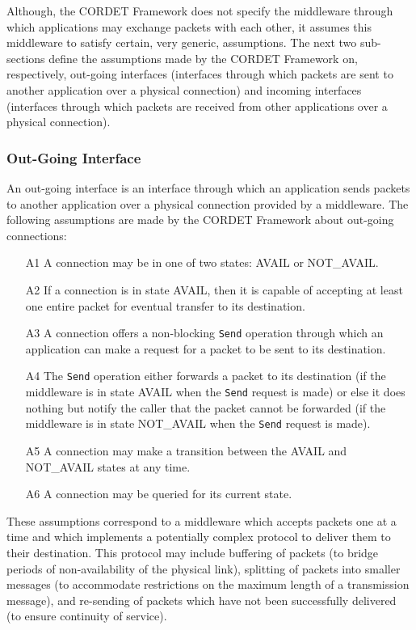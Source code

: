 Although, the CORDET Framework does not specify the middleware through which applications may exchange packets with each other, it assumes this middleware to satisfy certain, very generic, assumptions. The next two sub-sections define the assumptions made by the CORDET Framework on, respectively, out-going interfaces (interfaces through which packets are sent to another application over a physical connection) and incoming interfaces (interfaces through which packets are received from other applications over a physical connection).

\subsubsection{Out-Going Interface}\label{sec:OutGoingConnections}

An out-going interface is an interface through which an application sends packets to another application over a physical connection provided by a middleware. The following assumptions are made by the CORDET Framework about out-going connections:

\begin{itemize}
\item[A1]{A connection may be in one of two states: AVAIL or NOT\_AVAIL.}
\item[A2]{If a connection is in state AVAIL, then it is capable of accepting at least one entire packet for eventual transfer to its destination.}
\item[A3]{A connection offers a non-blocking \texttt{Send} operation through which an application can make a request for a packet to be sent to its destination.}
\item[A4]{The \texttt{Send} operation either forwards a packet to its destination (if the middleware is in state AVAIL when the \texttt{Send} request is made) or else it does nothing but notify the caller that the packet cannot be forwarded (if the middleware is in state NOT\_AVAIL when the \texttt{Send} request is made).}
\item[A5]{A connection may make a transition between the AVAIL and NOT\_AVAIL states at any time.}
\item[A6]{A connection may be queried for its current state.}
\end{itemize}

These assumptions correspond to a middleware which accepts packets one at a time and which implements a potentially complex protocol to deliver them to their destination. This protocol may include buffering of packets (to bridge periods of non-availability of the physical link), splitting of packets into smaller messages (to accommodate restrictions on the maximum length of a transmission message), and re-sending of packets which have not been successfully delivered (to ensure continuity of service). 

